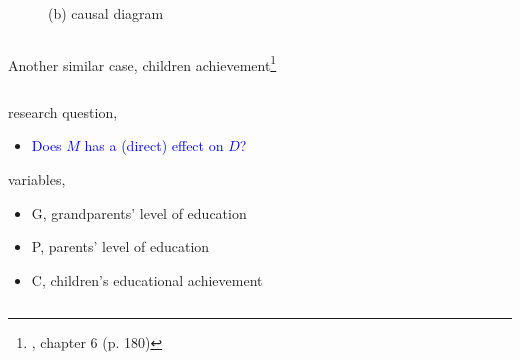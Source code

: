 \begin{frame}
\begin{columns}
\begin{column}{0.5\textwidth}
\begin{figure}
				\caption*{(b) causal diagram}
			\end{figure}
		\end{column}
	\end{columns}
\end{frame}
%
%
\begin{frame}
	{Another similar case, children achievement\footnote{\citet{McElreath_2020}, chapter 6 (p. 180)}}
	\begin{columns}
		\begin{column}{0.5\textwidth}
			research question, 
			\begin{itemize}
				\item \textcolor{blue}{Does $M$ has a (direct) effect on $D$?}
			\end{itemize}
			
			variables,
			\begin{itemize}
				\item G, grandparents' level of education
				\item P, parents' level of education
				\item C, children's educational achievement
			\end{itemize}
			

\end{column}
\end{columns}
\end{frame}
